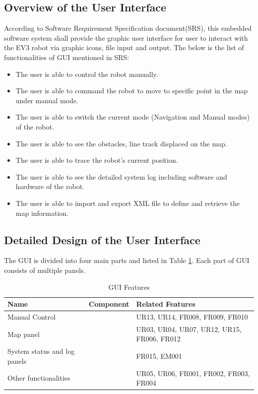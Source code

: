 \subsection{Overview of the User Interface}
According to Software Requirement Specification document(SRS), this embedded software system shall provide the graphic user interface for user to interact with the EV3 robot via graphic icons, file input and output. The below is the list of functionalities of GUI mentioned in SRS:
\begin{itemize}
	\item The user is able to control the robot manually.
	\item The user is able to command the robot to move to specific point in the map under manual mode.
	\item The user is able to switch the current mode (Navigation and Manual modes) of the robot.
	\item The user is able to see the obstacles, line track displaced on the map.
	\item The user is able to trace the robot's current position.
	\item The user is able to see the detailed system log including software and hardware of the robot.
	\item The user is able to import and export XML file to define and retrieve the map information.
\end{itemize}

\subsection{Detailed Design of the User Interface}
The GUI is divided into four main parts and listed in Table \ref{GUI Features}. Each part of GUI consists of multiple panels.

\begin{table}[H]
	\centering
	\caption{GUI Features}
	\label{GUI Features}
	\begin{tabular}{|p{3cm}|p{2cm}|p{6cm}|}
		\hline
		Name & Component & Related Features \\ \hline
		Manual Control &  & UR13, UR14, FR008, FR009, FR010 \\ \hline
		Map panel  &  & UR03, UR04, UR07, UR12, UR15, FR006, FR012 \\ \hline
		System status and log panels &  & FR015, EM001 \\ \hline
		Other functionalities &  &  UR05, UR06, FR001, FR002, FR003, FR004 \\ \hline
	\end{tabular}
\end{table}

